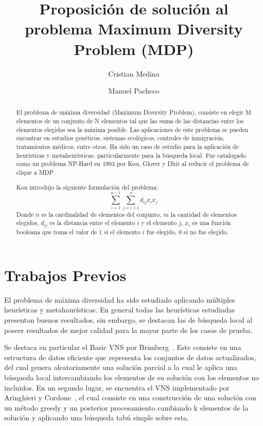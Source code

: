 \documentclass{ci5652}
\title{Proposición de solución al problema Maximum Diversity Problem (MDP)}
\author{Cristian Medina
        \and
        Manuel Pacheco}
\begin{document}
\thispagestyle{empty}
\maketitle


\begin{abstract}
El problema de máxima diversidad (Maximum Diversity Problem), consiste en elegir M elementos de un conjunto de N elementos tal que las suma de las distancias entre los elementos elegidos sea la máxima posible.
Las aplicaciones de este problema se pueden  encontrar en estudios genéticos, sistemas ecológicos, controles de inmigración, tratamientos médicos, entre otros. Ha sido un caso de estudio para la aplicación de heurísticas y metaheurísticas, particularmente para la búsqueda local.
Fue catalogado como un problema NP-Hard en 1993 por Kou, Glover y Dhit al reducir el problema de clique a MDP.

Kou introdujo la siguiente formulación del problema:
$$\sum_{i=1}^{n-1} \sum_{j=i+1}^n d_{ij}x_ix_j$$
Donde $n$ es la cardinalidad de elementos del conjunto, $m$ la cantidad de elementos elegidos, $d_{ij}$ es la distancia entre el elemento $i$ y el elemento $j$, $x_i$ es una función booleana que toma el valor de 1 si el elemento $i$ fue elegido, 0 si no fue elegido.
\end{abstract}

\section{Trabajos Previos}
El problema de máxima diversidad ha sido estudiado aplicando múltiples heurísticas y metahaurísticas. En general todas las heurísticas estudiadas presentan buenos resultados, sin embargo, se destacan las de búsqueda local al poseer resultados de mejor calidad para la mayor parte de los casos de prueba.

Se destaca en particular el Basic VNS por Brimberg~\cite{vnsbrimberg}. Este consiste en una estructura de datos eficiente que representa los conjuntos de datos actualizados, del cual genera aleatoriamente una solución parcial a la cual le aplica una búsqueda local intercambiando los elementos de su solución con los elementos no incluidos.
En un segundo lugar, se encuentra el VNS implementado por Aringhieri y Cordone~\cite{vnsarincor}, el cual consiste en una construcción de una solución con un método greedy y un posterior procesamiento cambiando k elementos de la solución y aplicando una búsqueda tabú simple sobre esta.
\end{document}
